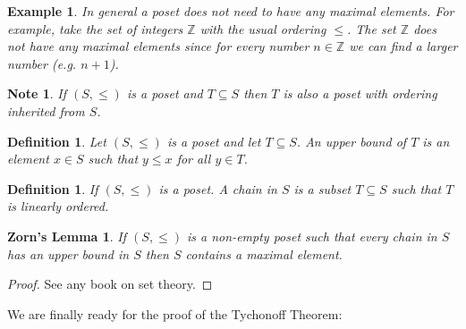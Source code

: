\documentclass[11pt, letterpaper, oneside]{report}
\theoremstyle{pplain}
\newtheorem{ITERMVALUE THM}[theorem]{Intermediate Value Theorem}
\newtheorem{HEINEBOREL THM}[theorem]{Heine-Borel Theorem}
\newtheorem{UMETR THM}[theorem]{Urysohn Metrization Theorem}
\newtheorem{UMETR2 THM}[theorem]{Urysohn Metrization Theorem (v.2)}
\newtheorem{ZORNLEMMA}[theorem]{Zorn's Lemma}
\theoremstyle{ddefinition}
\newtheorem{definition}[theorem]{Definition}
\newtheorem{example}[theorem]{Example}
\newtheorem{note}[theorem]{Note}
\theoremstyle{nnn}
\newtheorem{TDA NN}[theorem]{Topological Data Analysis. }
\theoremstyle{eexercise}
\newcommand{\Z}{{\mathbb Z}}
\begin{document}
\begin{example}
In general a poset does not need to have any maximal elements. For example,  take the set  
of integers $\Z$ with the usual ordering $\leq$. The set $\Z$ does not have any maximal elements 
since for every number $n\in \Z$ we can find a larger number (e.g. $n+1$).   
\end{example}

\begin{note}
If $(S, \leq)$ is a poset and $T\subseteq S$ then $T$ is also a poset with ordering inherited from 
$S$. 
\end{note}

\begin{definition}
Let $(S, \leq)$ is a poset and let  $T\subseteq S$. An \emph{upper bound of $T$} is an element 
$x\in S$ such that  $y\leq x$ for all $y\in T$.  
\end{definition}

\begin{definition}
If $(S, \leq)$ is a poset. A \emph{chain} in $S$ is a subset  $T\subseteq S$ such that 
$T$ is linearly ordered.   
\end{definition}

\begin{ZORNLEMMA}
\label{LEMMA_ZL}
If $(S, \leq)$ is a non-empty poset such that every chain in $S$ has an upper bound in $S$
then $S$ contains a maximal element.  
\end{ZORNLEMMA}

\begin{proof}
See any book on set theory. 
\end{proof}

We are finally ready for the proof of the Tychonoff Theorem: 
\end{document}
